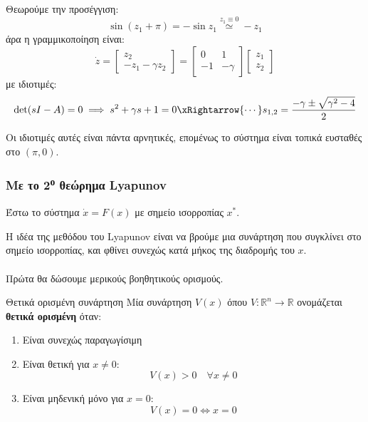 \documentclass[11pt,a4paper,notitlepage,fleqn]{article}
\begin{document}
\begin{exercise}[Παράδειγμα]
    Θεωρούμε την προσέγγιση:
    \[
    \sin(z_1 + π) = -\sin z_1 \overset{z_1 \equiv 0}{\simeq} -z_1
    \]
    άρα η γραμμικοποίηση είναι:
    \[
    \dot z = \left[\begin{matrix}
    z_2 \\ -z_1-\gamma z_2
    \end{matrix}\right] = \left[\begin{matrix}
    0 & 1 \\ -1 &-\gamma
    \end{matrix}
    \right]\left[\begin{matrix}
    z_1 \\ z_2
    \end{matrix}\right]
    \]
    με ιδιοτιμές:
    \[
    \det(sI-A) = 0 \implies s^2 + \gamma s + 1 =0 \xRightarrow{\cdots} s_{1,2} = \frac{-\gamma \pm \sqrt{\gamma^2-4}}{2}
    \]

    Οι ιδιοτιμές αυτές είναι πάντα αρνητικές, επομένως το σύστημα είναι τοπικά ευσταθές στο \( (π,0) \).
\end{exercise}

\subsubsection{Με το 2\textsuperscript{ο} θεώρημα Lyapunov}
Έστω το σύστημα \( \dot x = F(x) \) με σημείο ισορροπίας \( x^* \).

Η ιδέα της μεθόδου του Lyapunov είναι να βρούμε μια συνάρτηση που συγκλίνει
στο σημείο ισορροπίας, και φθίνει συνεχώς κατά μήκος της διαδρομής του \( x \).

\paragraph{}
Πρώτα θα δώσουμε μερικούς βοηθητικούς ορισμούς.

\begin{defn}{Θετικά ορισμένη συνάρτηση}{}
	Μία συνάρτηση \( V(x) \) όπου \( V: \mathbb R^n \to \mathbb R \) ονομάζεται \textbf{θετικά
		ορισμένη} όταν:
	\begin{enumerate}
		\item Είναι συνεχώς παραγωγίσιμη
		\item Είναι θετική για \( x\neq 0 \):
		\[
		V(x) > 0 \quad \forall x\neq 0
		\]
		\item Είναι μηδενική μόνο για \( x=0 \):
		\[
		V(x) = 0 \iff x=0
		\]
	\end{enumerate}
\end{defn}
\end{document}
